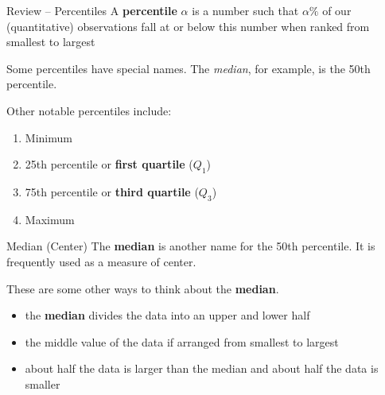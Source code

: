 \documentclass{beamer}
\begin{document}
\begin{frame}{Review -- Percentiles}
A \textbf{percentile} $\alpha$ is a number such that $\alpha\%$ of our (quantitative) observations fall at or below this number when ranked from smallest to largest \vspace{5mm}

Some percentiles have special names. The \textit{median}, for example, is the 50th percentile. \vspace{5mm}

Other notable percentiles include:
\begin{enumerate}
\item Minimum
\item 25th percentile or \textbf{first quartile} ($Q_1$)
\item 75th percentile or \textbf{third quartile} ($Q_3$)
\item Maximum
\end{enumerate}
\vspace{3mm}
\end{frame}



\begin{frame}{Median (Center)}
The \textbf{median} is another name for the 50th percentile. It is frequently used as a measure of center.\vspace{6mm}

These are some other ways to think about the \textbf{median}.
\begin{itemize}
    \item the \textbf{median} divides the data into an upper and lower half
    \item  the middle value of the data if arranged from smallest to largest
    \item about half the data is larger than the median and about half the data is smaller
\end{itemize}
\end{frame}
\end{document}
